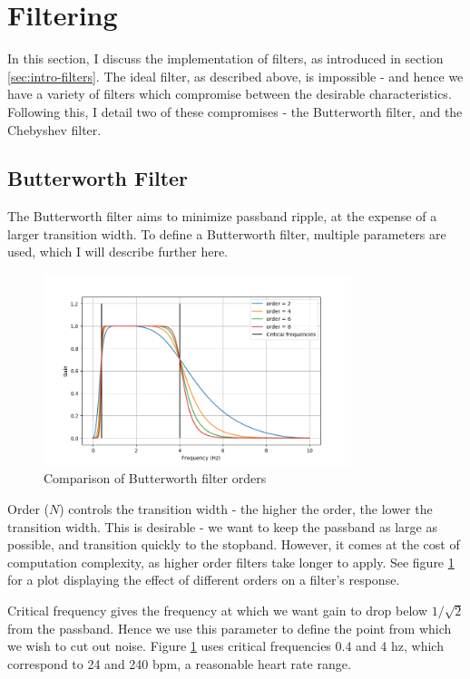 \documentclass[12pt,a4paper,twoside,openright]{report}
\begin{document}
\section{Filtering}

In this section, I discuss the implementation of filters, as introduced in
section
\ref{sec:intro-filters}. The ideal filter, as described above, is impossible - and 
hence we have a
variety of filters which compromise between the desirable characteristics.
Following this, I detail two of these compromises - the Butterworth filter,
and the Chebyshev filter.


\subsection{Butterworth Filter}

The Butterworth filter aims to minimize passband ripple, at the expense of a
larger transition width. To define a Butterworth filter, multiple parameters
are used, which I will describe further here.

\begin{figure}[h]
	\centerline{\includegraphics[width=0.8\textwidth]{figs/butter-order-comparison.png}}
\caption{Comparison of Butterworth filter orders}
\label{fig:butterworth-order}
\end{figure}

Order (\(N\)) controls the transition width - the higher the order, the lower
the transition width. This is desirable - we want to keep the passband as
large as possible, and transition quickly to the stopband. However, it comes
at the cost of computation complexity, as higher order filters take longer to
apply. See figure \ref{fig:butterworth-order} for a plot displaying the effect
of different orders on a filter's response.

Critical frequency gives the frequency at which we want gain to drop below
\(1/\sqrt2\) from the passband. Hence we use this parameter to define the
point from which we wish to cut out noise. Figure \ref{fig:butterworth-order}
uses critical frequencies 0.4 and 4 hz, which correspond to 24 and 240 bpm, a
reasonable heart rate range.
\end{document}
